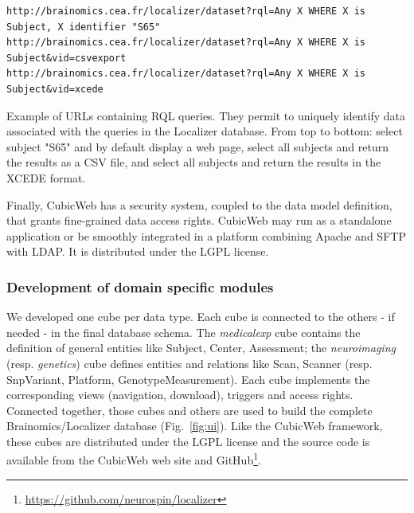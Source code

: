 \documentclass[review]{elsarticle}
\begin{document}
\begin{listing}[H]
\begin{verbatim}
http://brainomics.cea.fr/localizer/dataset?rql=Any X WHERE X is Subject, X identifier "S65"
http://brainomics.cea.fr/localizer/dataset?rql=Any X WHERE X is Subject&vid=csvexport
http://brainomics.cea.fr/localizer/dataset?rql=Any X WHERE X is Subject&vid=xcede
\end{verbatim}
\caption{Example of URLs containing RQL queries. They permit to uniquely identify data associated with the queries in the Localizer database. From top to bottom: select subject "S65" and by default display a web page, select all subjects and return the results as a CSV file, and select all subjects and return the results in the XCEDE format.}
\label{code:rql}
\end{listing}


Finally, CubicWeb has a security system, coupled to the data model definition, that grants fine-grained data access rights. CubicWeb may run as a standalone application or be smoothly integrated in a platform combining Apache and SFTP with LDAP. It is distributed under the LGPL license.


\subsubsection{Development of domain specific modules}

We developed one cube per data type. Each cube is connected to the others - if needed - in the final database schema. The \textit{medicalexp} cube contains the definition of general entities like Subject, Center, Assessment; the \textit{neuroimaging} (resp. \textit{genetics}) cube defines entities and relations like Scan, Scanner (resp. SnpVariant, Platform, GenotypeMeasurement). Each cube implements the corresponding views (navigation, download), triggers and access rights. Connected together, those cubes and others are used to build the complete Brainomics/Localizer database (Fig.~\ref{fig:ui}). Like the CubicWeb framework, these cubes are distributed under the LGPL license and the source code is available from the CubicWeb web site and GitHub\footnote{\url{https://github.com/neurospin/localizer}}.
\end{document}
